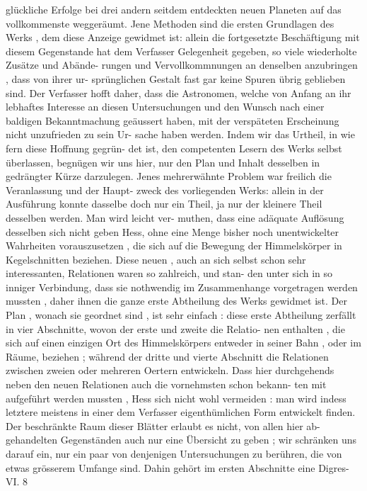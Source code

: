 \documentclass[12pt,a4paper]{article}
\begin{document}
\newpage

glückliche  Erfolge  bei  drei  andern  seitdem  entdeckten  neuen  Planeten  auf  das
vollkommenste  weggeräumt.
Jene  Methoden  sind  die  ersten  Grundlagen  des  Werks ,  dem  diese  Anzeige
gewidmet  ist:  allein  die  fortgesetzte  Beschäftigung  mit  diesem  Gegenstande  hat
dem  Verfasser  Gelegenheit  gegeben,  so  viele  wiederholte  Zusätze  und  Abände-
rungen und  Vervollkommnungen  an  denselben  anzubringen ,  dass  von  ihrer  ur-
sprünglichen Gestalt  fast  gar  keine  Spuren  übrig  geblieben  sind.  Der  Verfasser
hofft  daher,  dass  die  Astronomen,  welche  von  Anfang  an  ihr  lebhaftes  Interesse
an  diesen  Untersuchungen  und  den  Wunsch  nach  einer  baldigen  Bekanntmachung
geäussert  haben,  mit  der  verspäteten  Erscheinung  nicht  unzufrieden  zu  sein  Ur-
sache haben  werden.  Indem  wir  das  Urtheil,  in  wie  fern  diese  Hoffnung  gegrün-
det ist,  den  competenten  Lesern  des  Werks  selbst  überlassen,  begnügen  wir  uns
hier,  nur  den  Plan  und  Inhalt  desselben  in  gedrängter  Kürze  darzulegen.
Jenes  mehrerwähnte  Problem  war  freilich  die  Veranlassung  und  der  Haupt-
zweck des  vorliegenden  Werks:  allein  in  der  Ausführung  konnte  dasselbe  doch
nur  ein  Theil,  ja  nur  der  kleinere  Theil  desselben  werden.  Man  wird  leicht  ver-
muthen,  dass  eine  adäquate  Auflösung  desselben  sich  nicht  geben  Hess,  ohne  eine
Menge  bisher  noch  unentwickelter  Wahrheiten  vorauszusetzen ,  die  sich  auf  die
Bewegung  der  Himmelskörper  in  Kegelschnitten  beziehen.  Diese  neuen ,  auch
an  sich  selbst  schon  sehr  interessanten,  Relationen  waren  so  zahlreich,  und  stan-
den unter  sich  in  so  inniger  Verbindung,  dass  sie  nothwendig  im  Zusammenhange
vorgetragen  werden  mussten ,  daher  ihnen  die  ganze  erste  Abtheilung  des  Werks
gewidmet  ist.  Der  Plan ,  wonach  sie  geordnet  sind ,  ist  sehr  einfach :  diese  erste
Abtheilung  zerfällt  in  vier  Abschnitte,  wovon  der  erste  und  zweite  die  Relatio-
nen enthalten ,  die  sich  auf  einen  einzigen  Ort  des  Himmelskörpers  entweder  in
seiner  Bahn ,  oder  im  Räume,  beziehen ;  während  der  dritte  und  vierte  Abschnitt
die  Relationen  zwischen  zweien  oder  mehreren  Oertern  entwickeln.  Dass  hier
durchgehends  neben  den  neuen  Relationen  auch  die  vornehmsten  schon  bekann-
ten mit  aufgeführt  werden  mussten ,  Hess  sich  nicht  wohl  vermeiden :  man  wird
indess  letztere  meistens  in  einer  dem  Verfasser  eigenthümlichen  Form  entwickelt
finden.  Der  beschränkte  Raum  dieser  Blätter  erlaubt  es  nicht,  von  allen  hier  ab-
gehandelten Gegenständen  auch  nur  eine  Übersicht  zu  geben ;  wir  schränken  uns
darauf  ein,  nur  ein  paar  von  denjenigen  Untersuchungen  zu  berühren,  die  von
etwas  grösserem  Umfange  sind.  Dahin  gehört  im  ersten  Abschnitte  eine  Digres-
VI.  8
\end{document}
